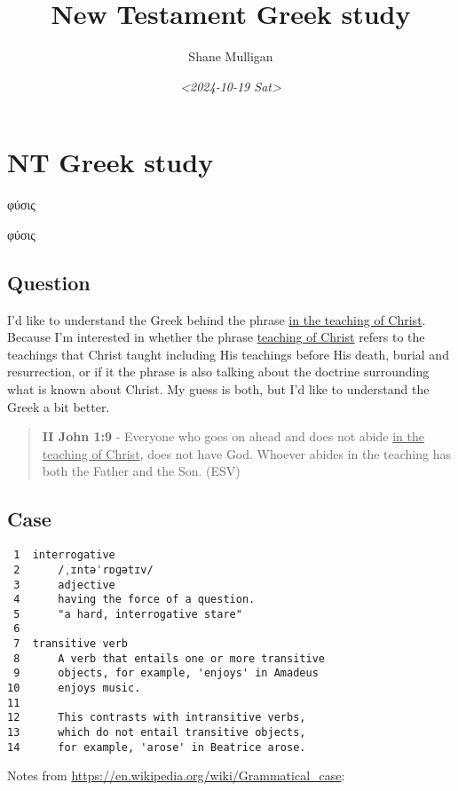 \documentclass[11pt]{article}
\author{Shane Mulligan}
\date{\textit{<2024-10-19 Sat>}}
\title{New Testament Greek study}
\begin{document}
\maketitle

\section{NT Greek study}
\label{sec:org4e6d579}

φύσις

\textgreek{φύσις}

\subsection{Question}
\label{sec:orged021a1}

I'd like to understand the Greek behind the phrase \uline{in the teaching of Christ}.
Because I'm interested in whether the phrase \uline{teaching of Christ} refers to the teachings that Christ
taught including His teachings before His death, burial and resurrection, or
if it the phrase is also talking about the doctrine surrounding what is known about Christ.
My guess is both, but I'd like to understand the Greek a bit better.

\begin{quote}
\textbf{II John 1:9} - Everyone who goes on ahead and does not abide \uline{in the teaching of Christ}, does not have God. Whoever abides in the teaching has both the Father and the Son. (ESV)
\end{quote}

\subsection{Case}
\label{sec:org69828a5}

\begin{verbatim}
 1  interrogative
 2      /ˌɪntəˈrɒɡətɪv/
 3      adjective
 4      having the force of a question.
 5      "a hard, interrogative stare"
 6  
 7  transitive verb
 8      A verb that entails one or more transitive
 9      objects, for example, 'enjoys' in Amadeus
10      enjoys music.
11  
12      This contrasts with intransitive verbs,
13      which do not entail transitive objects,
14      for example, 'arose' in Beatrice arose.
\end{verbatim}

Notes from \url{https://en.wikipedia.org/wiki/Grammatical\_case}:
\end{document}
